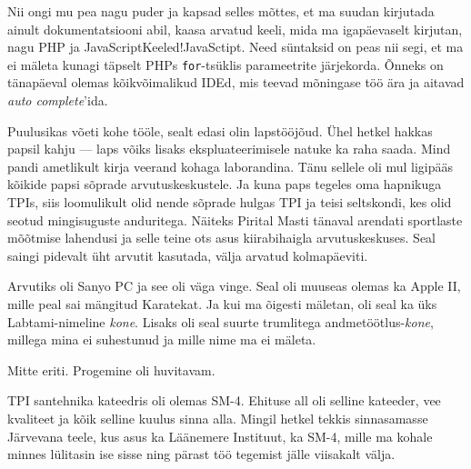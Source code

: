 Nii ongi mu pea nagu puder ja kapsad selles mõttes, et ma suudan kirjutada 
ainult dokumentatsiooni abil, kaasa arvatud keeli, mida ma igapäevaselt 
kirjutan, nagu PHP ja JavaScript{Keeled!JavaSctipt}. Need 
süntaksid on peas nii segi, et ma ei mäleta kunagi täpselt 
PHPs \verb|for|-tsüklis parameetrite järjekorda. Õnneks on tänapäeval 
olemas kõikvõimalikud IDEd, mis teevad mõningase töö ära ja aitavad \emph{auto 
complete}'ida. 


Puulusikas võeti kohe tööle, sealt edasi olin lapstööjõud. Ühel
hetkel hakkas papsil kahju --- laps võiks lisaks 
ekspluateerimisele natuke ka raha saada. Mind pandi ametlikult kirja 
veerand kohaga laborandina. Tänu sellele oli mul ligipääs kõikide papsi sõprade arvutuskeskustele. 
Ja kuna paps tegeles oma hapnikuga TPIs, siis loomulikult olid nende 
sõprade hulgas TPI ja teisi seltskondi, kes olid seotud mingisuguste 
anduritega. Näiteks Pirital Masti tänaval 
arendati sportlaste mõõtmise lahendusi ja selle teine ots asus 
kiirabihaigla arvutuskeskuses. Seal saingi 
pidevalt üht arvutit kasutada, välja arvatud kolmapäeviti. 

Arvutiks oli Sanyo PC ja see oli väga vinge. Seal oli muuseas olemas ka Apple II, mille peal sai mängitud Karatekat. Ja kui ma 
õigesti mäletan, oli seal ka üks Labtami-nimeline \emph{kone}. Lisaks oli seal
suurte trumlitega andmetöötlus-\emph{kone}, millega mina ei suhestunud ja mille  
nime ma ei mäleta. 


Mitte eriti. Progemine oli huvitavam. 

TPI santehnika kateedris oli olemas SM-4. Ehituse all oli 
selline kateeder, vee kvaliteet ja kõik selline kuulus sinna alla. Mingil 
hetkel tekkis sinnasamasse Järvevana teele, kus asus ka Läänemere 
Instituut, ka 
SM-4, mille ma kohale 
minnes lülitasin ise sisse ning pärast töö tegemist jälle viisakalt välja. 

